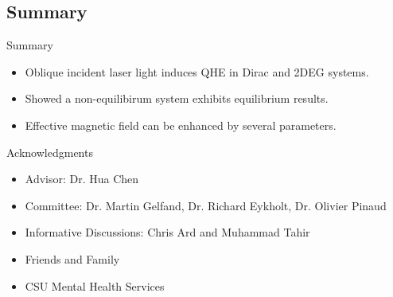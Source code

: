 \documentclass[xcolor=dvipsnames,10pt,aspectratio=169]{beamer}
\newcommand{\CO}{Summary}
\begin{document}
  \subsection{\CO}

  \begin{frame}{\CO}
    \begin{itemize}
      \item Oblique incident laser light induces QHE in Dirac and 2DEG systems.
      \item Showed a non-equilibirum system exhibits equilibrium  results.
      \item Effective magnetic field can be enhanced by several parameters.
    \end{itemize}
  \end{frame}


  \centering
  \begin{frame}{Acknowledgments}
    \vspace{2em}
    \begin{itemize}
      \item Advisor: Dr. Hua Chen
      \item Committee: Dr. Martin Gelfand, Dr. Richard Eykholt, Dr. Olivier Pinaud
      \item Informative Discussions: Chris Ard and Muhammad Tahir
      \item Friends and Family
      \item CSU Mental Health Services
    \end{itemize}
  \end{frame}

  \appendix
\end{document}
